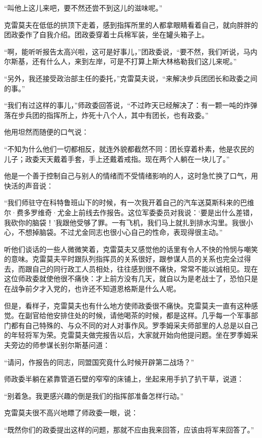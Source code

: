 “叫他上这儿来吧，要不然还尝不到这儿的滋味呢。”

克雷莫夫在低低的拱顶下走着，感到指挥所里的人都拿眼睛看着自己，就向胖胖的团政委作了自我介绍。团政委穿着士兵棉军装，坐在罐头箱子上。

“啊，能听听报告太高兴啦，这可是好事儿，”团政委说，“要不然，我们听说，马内尔斯基，还有什么人，来到左岸，可是不打算上斯大林格勒我们这儿来呢。”

“另外，我还接受政治部主任的委托，”克雷莫夫说，“来解决步兵团团长和政委之间的事。”

“我们有过这样的事儿，”师政委回答说，“不过昨天已经解决了：有一颗一吨的炸弹落在步兵团的指挥所上，炸死十八个人，其中有团长，也有政委。”

他用坦然而随便的口气说：

“不知为什么他们一切都相反，就连外貌都截然不同：团长穿着朴素，他是农民的儿子；政委天天戴着手套，手上还戴着戒指。现在两个人躺在一块儿了。”

他是一个善于控制自己与别人的情绪而不受情绪影响的人，这时急忙换了口气，用快活的声音说：

“我们师驻守在科特鲁班山下的时候，有一次我开着自己的汽车送莫斯科来的巴维尔·费多罗维奇·尤金上前线去作报告。这位军委委员对我说：‘要是出什么差错，我砍你的脑袋！’我跟他受够了罪。一有飞机，我们马上就扎到排水沟里。我很小心，不想掉脑袋。不过尤金同志也很小心自己的性命，表现得很主动。”

听他们谈话的一些人微微笑着，克雷莫夫又感觉他的话里有令人不快的怜悯与嘲笑的意味。克雷莫夫平时跟队列指挥员的关系很好，跟参谋人员的关系也完全过得去，而跟自己的同行政工人员相处，往往感到很不痛快，常常不能以诚相见。现在这位师政委就使他很不痛快：才上前方没有几天，就自以为是老战士了，恐怕只是在战争前夕才入党的，也许还不知道恩格斯是什么人呢。

但是，看样子，克雷莫夫也有什么地方使师政委很不痛快。克雷莫夫一直有这种感觉。在副官给他安排住处的时候，请他喝茶的时候，都是这样。几乎每一个军事部门都有自己特殊的、与众不同的对人对事作风。罗季姆采夫师部里的人总是以自己的年轻将军为荣。克雷莫夫做完报告以后，大家就开始向他提问题。坐在罗季姆采夫旁边的师参谋长别尔斯基问道：

“请问，作报告的同志，同盟国究竟什么时候开辟第二战场？”

师政委半躺在紧靠管道石壁的窄窄的床铺上，坐起来用手扒了扒干草，说道：

“别着急。我更感兴趣的倒是我们的指挥部准备怎样行动。”

克雷莫夫很不高兴地瞟了师政委一眼，说：

“既然你们的政委提出这样的问题，那就不应由我来回答，应该由将军来回答了。”

